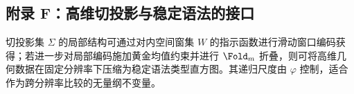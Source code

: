 \subsection{附录 F：高维切投影与稳定语法的接口}

切投影集 $\Sigma$ 的局部结构可通过对内空间窗集 $W$ 的指示函数进行滑动窗口编码获得；若进一步对局部编码施加黄金均值约束并进行 $\Fold_m$ 折叠，则可将高维几何数据在固定分辨率下压缩为稳定语法类型直方图。其递归尺度由 $\varphi$ 控制，适合作为跨分辨率比较的无量纲不变量。
